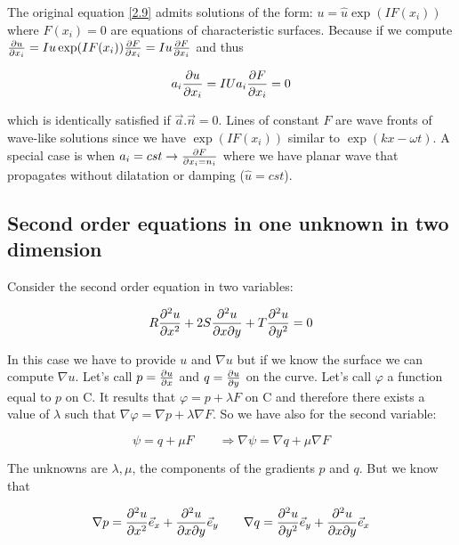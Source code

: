 The original equation \eqref{2.9} admits solutions of the form: $u = \hat{u}\exp (IF(x_i))$ where $F(x_i) = 0$ are equations of characteristic surfaces. Because if we compute $\frac{\partial u}{\partial x_i} = I u \exp (IF(x _i))\frac{\partial F}{\partial x_i} = Iu\frac{\partial F}{\partial x_i}$ and thus 

\begin{equation}
a_i \frac{\partial u }{\partial x_i} = IU a_i \frac{\partial F}{\partial x_i}=0
\end{equation}

which is identically satisfied if $\vec{a}.\vec{n} = 0$. Lines of constant $F$ are wave fronts of wave-like solutions since we have $\exp (I F(x_i))$ similar to $\exp (kx - \omega t)$. A special case is when $a_i = cst \rightarrow \frac{\partial F}{\partial x_i = n_i}$ where we have planar wave that propagates without dilatation or damping ($\hat{u}=cst$).  

\subsection{Second order equations in one unknown in two dimension}
Consider the second order equation in two variables:

\begin{equation}
R\frac{\partial ^2 u}{\partial x^2} + 2S \frac{\partial ^2 u}{\partial x\partial y} + T \frac{\partial ^2 u}{\partial y^2} = 0
\end{equation}

In this case we have to provide $u$ and $\nabla u$ but if we know the surface we can compute $\nabla u$. Let's call $p = \frac{\partial u}{\partial x}$ and $q = \frac{\partial u}{\partial y}$ on the curve. Let's call $\varphi$ a function equal to $p$ on C. It results that $\varphi = p + \lambda F$ on C and therefore there exists a value of $\lambda$ such that $\nabla \varphi = \nabla p + \lambda \nabla F$. So we have also for the second variable: 

\begin{equation}
\psi = q + \mu F \qquad \Rightarrow \nabla \psi = \nabla q + \mu \nabla F
\end{equation}

The unknowns are $\lambda , \mu$, the components of the gradients $p$ and $q$. But we know that 

\begin{equation}
\nabla p = \frac{\partial ^2 u}{\partial x^2} \vec{e}_x + \frac{\partial ^2 u}{\partial x \partial y} \vec{e}_y\qquad \nabla q = \frac{\partial ^2 u}{\partial y^2} \vec{e}_y + \frac{\partial ^2 u}{\partial x \partial y} \vec{e}_x
 \end{equation}
 
